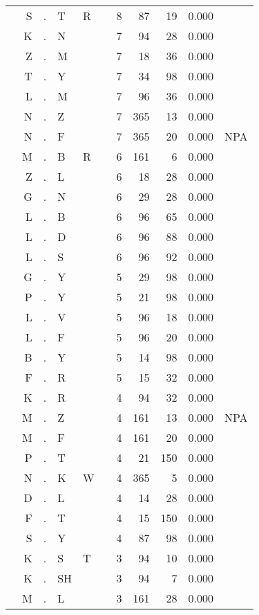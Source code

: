 \begin{longtable}{r@{ } r@{ } c@{ } l@{ } l@{ } l@{ } r r r r l }
 & S & . & T & R &  & 8 & 87 & 19 & 0.000 &  \\
 & K & . & N &  &  & 7 & 94 & 28 & 0.000 &  \\
 & Z & . & M &  &  & 7 & 18 & 36 & 0.000 &  \\
 & T & . & Y &  &  & 7 & 34 & 98 & 0.000 &  \\
 & L & . & M &  &  & 7 & 96 & 36 & 0.000 &  \\
 & N & . & Z &  &  & 7 & 365 & 13 & 0.000 &  \\
 & N & . & F &  &  & 7 & 365 & 20 & 0.000 & \textsc{NPA} \\
 & M & . & B & R &  & 6 & 161 & 6 & 0.000 &  \\
 & Z & . & L &  &  & 6 & 18 & 28 & 0.000 &  \\
 & G & . & N &  &  & 6 & 29 & 28 & 0.000 &  \\
 & L & . & B &  &  & 6 & 96 & 65 & 0.000 &  \\
 & L & . & D &  &  & 6 & 96 & 88 & 0.000 &  \\
 & L & . & S &  &  & 6 & 96 & 92 & 0.000 &  \\
 & G & . & Y &  &  & 5 & 29 & 98 & 0.000 &  \\
 & P & . & Y &  &  & 5 & 21 & 98 & 0.000 &  \\
 & L & . & V &  &  & 5 & 96 & 18 & 0.000 &  \\
 & L & . & F &  &  & 5 & 96 & 20 & 0.000 &  \\
 & B & . & Y &  &  & 5 & 14 & 98 & 0.000 &  \\
 & F & . & R &  &  & 5 & 15 & 32 & 0.000 &  \\
 & K & . & R &  &  & 4 & 94 & 32 & 0.000 &  \\
 & M & . & Z &  &  & 4 & 161 & 13 & 0.000 & \textsc{NPA} \\
 & M & . & F &  &  & 4 & 161 & 20 & 0.000 &  \\
 & P & . & T &  &  & 4 & 21 & 150 & 0.000 &  \\
 & N & . & K & W &  & 4 & 365 & 5 & 0.000 &  \\
 & D & . & L &  &  & 4 & 14 & 28 & 0.000 &  \\
 & F & . & T &  &  & 4 & 15 & 150 & 0.000 &  \\
 & S & . & Y &  &  & 4 & 87 & 98 & 0.000 &  \\
 & K & . & S & T &  & 3 & 94 & 10 & 0.000 &  \\
 & K & . & SH &  &  & 3 & 94 & 7 & 0.000 &  \\
 & M & . & L &  &  & 3 & 161 & 28 & 0.000 &  \\

\end{longtable}
